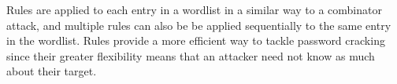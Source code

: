 Rules are applied to each entry in a wordlist in a similar way to a combinator attack, and multiple rules can also be be applied sequentially to the same entry in the wordlist.
Rules provide a more efficient way to tackle password cracking since their greater flexibility means that an attacker need not know as much about their target. 


 

